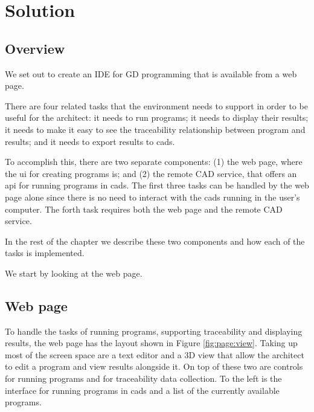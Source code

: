 
\chapter{Solution}
\label{chapter:solution}


\section{Overview}
We set out to create an IDE for GD programming that is available from a web page.

There are four related tasks that the environment needs to support in order to be useful for the architect:
it needs to run programs; it needs to display their results; it needs to make it easy to see the traceability relationship between program and results; and it needs to export results to \glspl{cad}.

To accomplish this, there are two separate components: (1) the web page, where the \gls{ui} for creating programs is; and (2) the remote CAD service, that offers an \gls{api} for running programs in \glspl{cad}.
The first three tasks can be handled by the web page alone since there is no need to interact with the \glspl{cad} running in the user's computer.
The forth task requires both the web page and the remote CAD service.

In the rest of the chapter we describe these two components and how each of the tasks is implemented.

We start by looking at the web page.


\section{Web page}
To handle the tasks of running programs, supporting traceability and displaying results, the web page has the layout shown in Figure \ref{fig:page:view}.
Taking up most of the screen space are a text editor and a 3D view that allow the architect to edit a program and view results alongside it.
On top of these two are controls for running programs and for traceability data collection.
To the left is the interface for running programs in \glspl{cad} and a list of the currently available programs.


